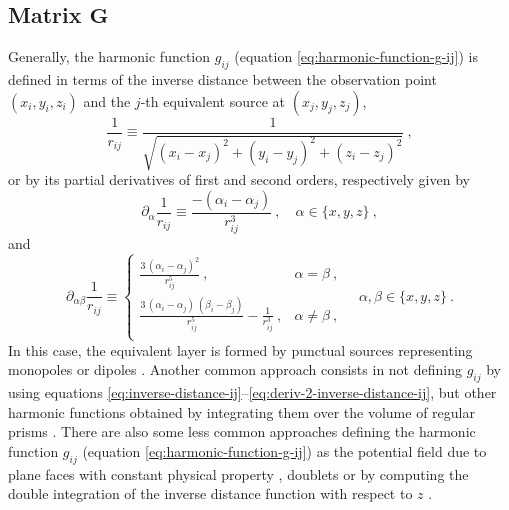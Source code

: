 \subsection{Matrix $\mathbf{G}$}
\label{subsec:sensitivity-matrix}

Generally, the harmonic function $g_{ij}$ (equation \ref{eq:harmonic-function-g-ij}) is defined in terms of the 
inverse distance between the observation point $(x_{i}, y_{i}, z_{i})$ and the $j$-th equivalent source at $(x_{j}, y_{j}, z_{j})$,
\begin{equation}
	\frac{1}{r_{ij}} \equiv \frac{1}{\sqrt{(x_{i} - x_{j})^{2} + (y_{i} - y_{j})^{2} + (z_{i} - z_{j})^{2}}} \: ,
	\label{eq:inverse-distance-ij}
\end{equation}
or by its partial derivatives of first and second orders, respectively given by
\begin{equation}
	\partial_{\alpha} \frac{1}{r_{ij}} \equiv \frac{-(\alpha_{i} - \alpha_{j})}{r_{ij}^{3}} \: ,
	\quad \alpha \in \{ x, y, z \} \: ,
	\label{eq:deriv-1-inverse-distance-ij}
\end{equation}
and
\begin{equation}
	\partial_{\alpha\beta} \frac{1}{r_{ij}} \equiv 
	\begin{cases}
		\frac{3 \, (\alpha_{i} - \alpha_{j})^{2}}{r_{ij}^{5}} \: , &\alpha = \beta \: , \\
		\frac{3 \, (\alpha_{i} - \alpha_{j}) \, (\beta_{i} - \beta_{j})}{r_{ij}^{5}} - \frac{1}{r_{ij}^{3}} \: , &\alpha \ne \beta \: , \\
	\end{cases}
	\quad \alpha, \beta \in \{ x, y, z \} \: .
	\label{eq:deriv-2-inverse-distance-ij}
\end{equation}
In this case, the equivalent layer is formed by punctual sources representing monopoles or dipoles
\cite[e.g.,][]{dampney1969, emilia1973, leao-silva1989, cordell1992, oliveirajr-etal2013, siqueira-etal2017, reis-etal2020, takahashi-etal2020, soler-uieda2021, takahashi-etal2022}.
Another common approach consists in not defining $g_{ij}$ by using equations \ref{eq:inverse-distance-ij}--\ref{eq:deriv-2-inverse-distance-ij},
but other harmonic functions obtained by integrating them over the volume of regular prisms 
\cite[e.g.,][]{li-oldenburg2010, barnes-lumley2011, li_etal_2014, jirigalatu-ebbing2019}.
There are also some less common approaches defining the harmonic function $g_{ij}$ (equation \ref{eq:harmonic-function-g-ij})
as the potential field due to plane faces with constant physical property \citep{hansen-miyazaki1984}, doublets \citep{silva1986} or
by computing the double integration of the inverse distance function with respect to $z$ \citep{guspi-novara2009}.

